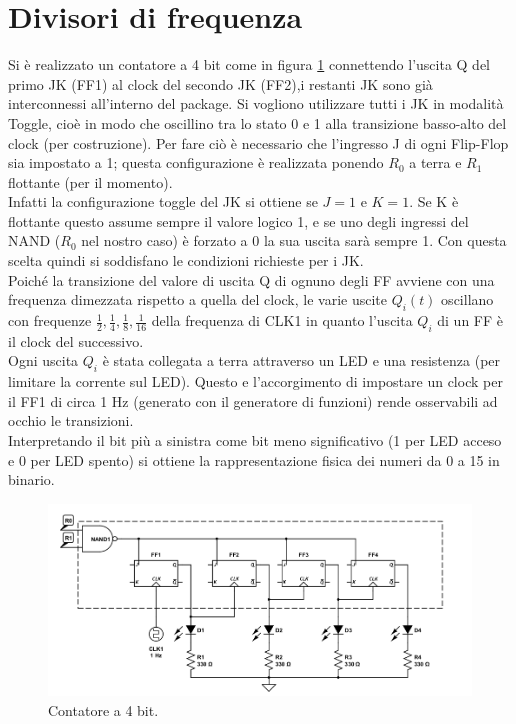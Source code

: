 \documentclass[10pt,a4paper]{article}
\begin{document}
\section{Divisori di frequenza}
Si è realizzato un contatore a 4 bit come in figura \ref{contatore} connettendo l'uscita Q del primo JK (FF1) al clock del secondo JK (FF2),i restanti JK sono già interconnessi all'interno del package. Si vogliono utilizzare tutti i JK in modalità Toggle, cioè in modo che oscillino tra lo stato 0 e 1 alla transizione basso-alto del clock (per costruzione). Per fare ciò è necessario che l'ingresso J di ogni Flip-Flop sia impostato a 1; questa configurazione è realizzata ponendo $R_0$ a terra e $R_1$ flottante (per il momento).\\
Infatti la configurazione toggle del JK si ottiene se $J = 1$ e $K = 1$. Se K è flottante questo assume sempre il valore logico 1, e se uno degli ingressi del NAND ($R_0$ nel nostro caso) è forzato a 0 la sua uscita sarà sempre 1. Con questa scelta quindi si soddisfano le condizioni richieste per i JK.\\  
Poiché la transizione del valore di uscita Q di ognuno degli FF avviene con una frequenza dimezzata rispetto a quella del clock, le varie uscite $Q_i(t)$ oscillano con frequenze $\frac{1}{2}, \frac{1}{4}, \frac{1}{8}, \frac{1}{16}$ della frequenza di CLK1 in quanto l'uscita $Q_i$ di un FF è il clock del successivo.\\
Ogni uscita $Q_i$ è stata collegata a terra attraverso un LED e una resistenza (per limitare la corrente sul LED). Questo e l'accorgimento di impostare un clock per il FF1 di circa 1 Hz (generato con il generatore di funzioni)%
 rende osservabili ad occhio le transizioni.\\
Interpretando il bit più a sinistra come bit meno significativo (1 per LED acceso e 0 per LED spento) si ottiene la rappresentazione fisica dei numeri da 0 a 15 in binario.\\

\begin{figure}
\centering
\includegraphics[scale=0.5]{divisore.png}
\caption{Contatore a 4 bit.\label{contatore}}
\end{figure}
\end{document}
